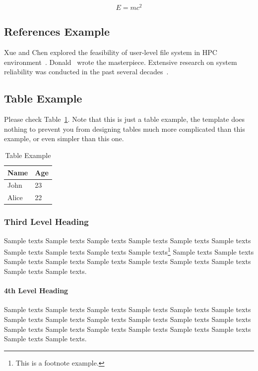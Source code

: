 \documentclass{ics}
\begin{document}
\begin{equation}
  \label{eq:1}
  E=mc^{2}
\end{equation}

\subsection{References Example}
\label{sec:ref-example}
Xue and Chen explored the feasibility of user-level file system in HPC
environment~\cite{xue08}. Donald~\cite{tex} wrote the masterpiece. Extensive
research on system reliability was conducted in the past several
decades~\cite{xue09,Chafik94,MellingerR96,NPB2}.

\subsection{Table Example}
\label{sec:table-example}
Please check Table~\ref{tab:example}. Note that this is just a table example,
the template does nothing to prevent you from designing tables much more
complicated than this example, or even simpler than this one.

\begin{table}[h]
  \centering
  \caption{Table Example}
  \label{tab:example}
  \begin{tabular}{l|l}
    \hline
    Name & Age \\
    \hline
    John & 23 \\
    \hline
    Alice & 22 \\
    \hline
  \end{tabular}
\end{table}

\subsubsection{Third Level Heading}
\label{sec:3rd-level-heading}
Sample texts Sample texts Sample texts Sample texts Sample texts Sample texts
Sample texts Sample texts Sample texts Sample texts\footnote{This is a footnote
  example.} Sample texts Sample texts Sample texts Sample texts Sample texts
Sample texts Sample texts Sample texts Sample texts Sample texts.

\paragraph{4th Level Heading}
\label{sec:4th-level-heading}
Sample texts Sample texts Sample texts Sample texts Sample texts Sample texts
Sample texts Sample texts Sample texts Sample texts Sample texts Sample texts
Sample texts Sample texts Sample texts Sample texts Sample texts Sample texts
Sample texts Sample texts.
\end{document}
